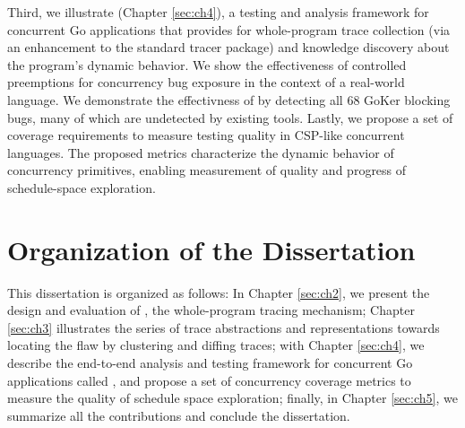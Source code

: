 Third, we illustrate \goat (Chapter \ref{sec:ch4}), a testing and analysis framework for concurrent Go applications that provides for whole-program trace collection (via an enhancement to the standard tracer package) and knowledge discovery about the program's dynamic behavior.
%
We show the effectiveness of controlled preemptions for concurrency bug exposure in the context of a real-world language.
%
We demonstrate the effectivness of \goat by detecting all 68 GoKer \cite{yuan-gobench-cgo21} blocking bugs, many of which are undetected by existing tools.
%
Lastly, we propose a set of coverage requirements to measure testing quality in CSP-like concurrent languages.
The proposed metrics characterize the dynamic behavior of concurrency primitives, enabling measurement of quality and progress of schedule-space exploration.


\section{Organization of the Dissertation}
This dissertation is organized as follows: In Chapter \ref{sec:ch2}, we present the design and evaluation of \parlot, the whole-program tracing mechanism; Chapter \ref{sec:ch3} illustrates the series of trace abstractions and representations towards locating the flaw by clustering and diffing traces; with Chapter \ref{sec:ch4}, we describe the end-to-end analysis and testing framework for concurrent Go applications called \goat, and propose a set of concurrency coverage metrics to measure the quality of schedule space exploration; finally, in Chapter \ref{sec:ch5}, we summarize all the contributions and conclude the dissertation.
